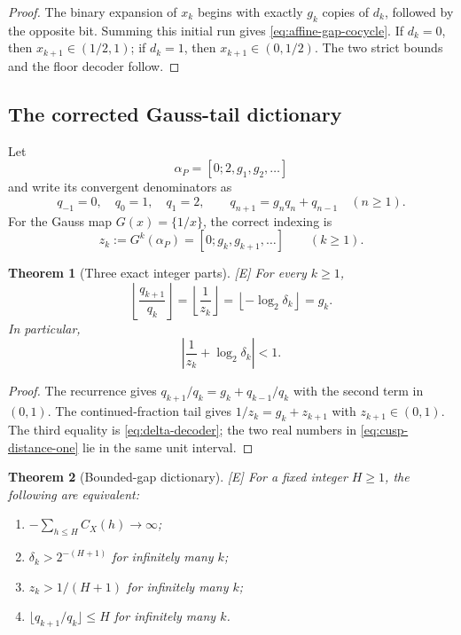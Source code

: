 \documentclass[11pt]{article}
\newtheorem{theorem}{Theorem}[section]
\theoremstyle{definition}
\theoremstyle{remark}
\newcommand{\status}[1]{\textnormal{\textcolor{accent}{\footnotesize[#1]}}}
\begin{document}
\begin{proof}
The binary expansion of $x_k$ begins with exactly $g_k$ copies of $d_k$, followed by
the opposite bit.  Summing this initial run gives \eqref{eq:affine-gap-cocycle}.  If
$d_k=0$, then $x_{k+1}\in(1/2,1)$; if $d_k=1$, then
$x_{k+1}\in(0,1/2)$.  The two strict bounds and the floor decoder follow.
\end{proof}

\subsection{The corrected Gauss-tail dictionary}

Let
\begin{equation}\label{eq:alphaP}
 \alpha_P=[0;2,g_1,g_2,\ldots]
\end{equation}
and write its convergent denominators as
\begin{equation}\label{eq:q-recurrence}
 q_{-1}=0,\quad q_0=1,\quad q_1=2,
 \qquad q_{n+1}=g_nq_n+q_{n-1}\quad(n\ge1).
\end{equation}
For the Gauss map $G(x)=\{1/x\}$, the correct indexing is
\begin{equation}\label{eq:zk-corrected}
 z_k:=G^k(\alpha_P)=[0;g_k,g_{k+1},\ldots]\qquad(k\ge1).
\end{equation}

\begin{theorem}[Three exact integer parts]\label{thm:three-decoders}
\status{E}
For every $k\ge1$,
\begin{equation}\label{eq:three-decoders}
 \left\lfloor\frac{q_{k+1}}{q_k}\right\rfloor
 =\left\lfloor\frac1{z_k}\right\rfloor
 =\left\lfloor-\log_2\delta_k\right\rfloor
 =g_k.
\end{equation}
In particular,
\begin{equation}\label{eq:cusp-distance-one}
 \left|\frac1{z_k}+\log_2\delta_k\right|<1.
\end{equation}
\end{theorem}

\begin{proof}
The recurrence gives
$q_{k+1}/q_k=g_k+q_{k-1}/q_k$ with the second term in $(0,1)$.  The continued-fraction
tail gives $1/z_k=g_k+z_{k+1}$ with $z_{k+1}\in(0,1)$.  The third equality is
\eqref{eq:delta-decoder}; the two real numbers in \eqref{eq:cusp-distance-one} lie in the
same unit interval.
\end{proof}

\begin{theorem}[Bounded-gap dictionary]\label{thm:bounded-gap-dictionary}
\status{E}
For a fixed integer $H\ge1$, the following are equivalent:
\begin{enumerate}[label=\textup{(\alph*)}]
 \item $-\sum_{h\le H}C_X(h)\to\infty$;
 \item $\delta_k>2^{-(H+1)}$ for infinitely many $k$;
 \item $z_k>1/(H+1)$ for infinitely many $k$;
 \item $\lfloor q_{k+1}/q_k\rfloor\le H$ for infinitely many $k$.
\end{enumerate}
\end{theorem}
\end{document}
